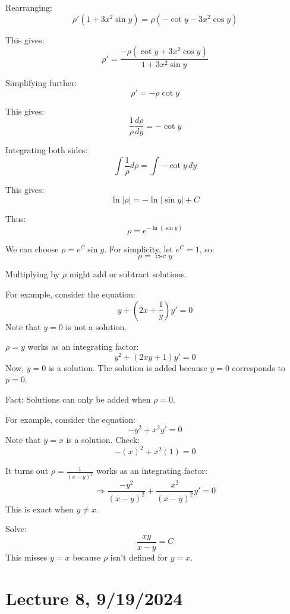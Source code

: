 \documentclass{article}
\begin{document}
Rearranging:
\[
\rho' (1 + 3x^2 \sin y) = \rho (-\cot y - 3x^2 \cos y)
\]

This gives:
\[
\rho' = \frac{-\rho (\cot y + 3x^2 \cos y)}{1 + 3x^2 \sin y}
\]

Simplifying further:
\[
\rho' = -\rho \cot y
\]

This gives:
\[
\frac{1}{\rho} \frac{d\rho}{dy} = -\cot y
\]

Integrating both sides:
\[
\int \frac{1}{\rho} d\rho = \int -\cot y \, dy
\]

This gives:
\[
\ln|\rho| = -\ln|\sin y| + C
\]

Thus:
\[
\rho = e^{-\ln(\sin y)} 
\]

We can choose \(\rho = e^C \sin y\). For simplicity, let \(e^C = 1\), so:
\[
\rho = \csc y
\]


Multiplying by \(\rho\) might add or subtract solutions.

For example, consider the equation:
\[
y + \left(2x + \frac{1}{y}\right)y' = 0
\]
Note that \(y = 0\) is not a solution.

\(\rho = y\) works as an integrating factor:
\[
y^2 + (2xy + 1)y' = 0
\]
Now, \(y = 0\) is a solution. The solution is added because \(y = 0\) corresponds to \(p = 0\).

Fact: Solutions can only be added when \(\rho = 0\).

For example, consider the equation:
\[
-y^2 + x^2 y' = 0
\]
Note that \(y = x\) is a solution. Check:
\[
-(x)^2 + x^2(1) = 0
\]

It turns out \(\rho = \frac{1}{(x - y)^2}\) works as an integrating factor:
\[
\Rightarrow \frac{-y^2}{(x - y)^2} + \frac{x^2}{(x - y)^2}y' = 0
\]
This is exact when \(y \neq x\).

Solve:
\[
\frac{xy}{x - y} = C
\]
This misses \(y = x\) because \(\rho\) isn't defined for \(y = x\).


\section*{Lecture 8, 9/19/2024}

\end{document}
